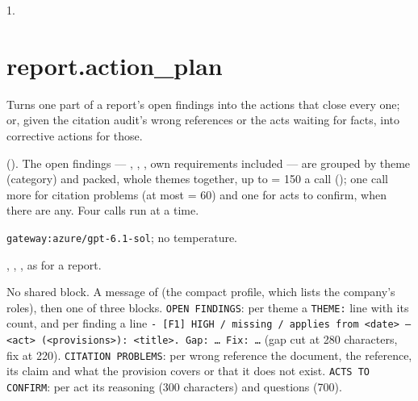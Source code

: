  1.


\section{report.action\_plan}\label{sec:aprompts:report-action_plan}

 Turns one part of a report's open findings into the actions that
close every one; or, given the citation audit's wrong references or the acts waiting for
facts, into corrective actions for those.

  (). The open
findings --- , , , own requirements included --- are
grouped by theme (category) and packed, whole themes together, up to
 = 150 a call (); one call more for citation
problems (at most  = 60) and one for acts to confirm, when there
are any. Four calls run at a time.

 \texttt{gateway:azure/gpt-6.1-sol}; no temperature.

 , , , as for a
report.

 No shared block. A message of  (the
compact profile, which lists the company's roles), then one of three blocks.
\texttt{OPEN FINDINGS}: per theme a \texttt{THEME:} line with its count, and per finding a line
\texttt{- [F1] HIGH / missing / applies from <date> — <act> (<provisions>): <title>. Gap: … Fix: …}
(gap cut at 280 characters, fix at 220). \texttt{CITATION PROBLEMS}: per wrong reference the
document, the reference, its claim and what the provision covers or that it does not exist.
\texttt{ACTS TO CONFIRM}: per act its reasoning (300 characters) and questions (700).

